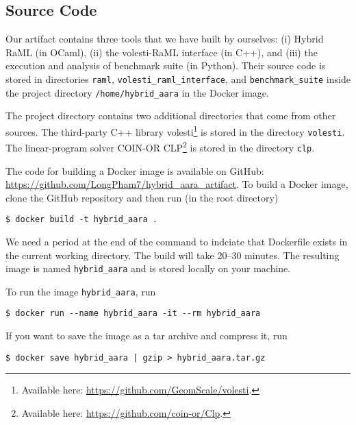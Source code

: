 \subsection{Source Code}

Our artifact contains three tools that we have built by ourselves: (i) Hybrid
RaML (in OCaml), (ii) the volesti-RaML interface (in C++), and (iii) the
execution and analysis of benchmark suite (in Python).
%
Their source code is stored in directories \texttt{raml},
\texttt{volesti\_raml\_interface}, and \texttt{benchmark\_suite} inside the
project directory \texttt{/home/hybrid\_aara} in the Docker image.

The project directory contains two additional directories that come from other
sources.
%
The third-party C++ library volesti\footnote{Available here:
  \url{https://github.com/GeomScale/volesti}.} is stored in the directory
\texttt{volesti}.
%
The linear-program solver COIN-OR CLP\footnote{Available here:
  \url{https://github.com/coin-or/Clp}.} is stored in the directory \texttt{clp}.

The code for building a Docker image is available on GitHub:
\url{https://github.com/LongPham7/hybrid_aara_artifact}.
%
To build a Docker image, clone the GitHub repository and then run (in the root
directory)
\begin{verbatim}
$ docker build -t hybrid_aara .
\end{verbatim}
%
We need a period at the end of the command to indciate that Dockerfile exists in
the current working directory.
%
The build will take 20--30 minutes.
%
The resulting image is named \texttt{hybrid\_aara} and is stored locally on your
machine.

To run the image \texttt{hybrid\_aara}, run
\begin{verbatim}
$ docker run --name hybrid_aara -it --rm hybrid_aara
\end{verbatim}
%
If you want to save the image as a tar archive and compress it, run
\begin{verbatim}
$ docker save hybrid_aara | gzip > hybrid_aara.tar.gz
\end{verbatim}

